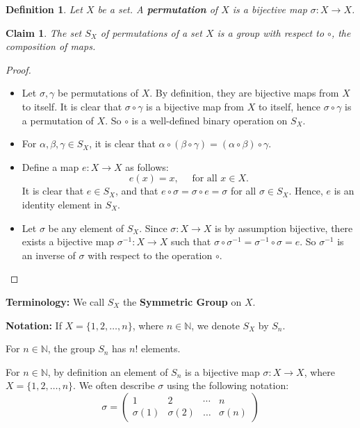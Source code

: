 \documentclass[a4paper,12pt]{report}
\newcommand{\ra}{\longrightarrow}
\newcounter{statement}
\numberwithin{statement}{chapter}
\newtheorem{defn}[statement]{Definition}
\newtheorem{claim}[statement]{Claim}
\numberwithin{equation}{chapter}
\numberwithin{section}{chapter}
\numberwithin{subsection}{section}
\begin{document}
\begin{defn}
Let $X$ be a set.  A  {\bf permutation}  of $X$ is a bijective map $\sigma : X \ra X$.
\end{defn}
\begin{claim}

The set $S_X$ of permutations of a set $X$
is a group with respect to $\circ$, the composition of maps.

\end{claim}
\begin{proof}

\begin{itemize}
\item 
Let $\sigma, \gamma$ be permutations of $X$.
By definition, they are bijective maps from $X$ to itself.
It is clear that $\sigma\circ\gamma$ is a bijective map from $X$ to itself,
hence $\sigma\circ\gamma$ is a permutation of $X$.  So $\circ$ is a well-defined
binary operation on $S_X$.

\item 
For $\alpha, \beta, \gamma \in S_X$, it is clear that
$\alpha\circ(\beta\circ \gamma) = (\alpha\circ\beta)\circ\gamma$.

\item 
Define a map $e : X \ra X$ as follows:
\[
e(x) = x,\quad \text{ for all } x \in X.
\]
It is clear that $e \in S_X$, and that $e \circ \sigma = \sigma\circ e = \sigma$
for all $\sigma \in S_X$.  Hence, $e$ is an identity element in $S_X$.

\item 
Let $\sigma$ be any element of $S_X$.  Since $\sigma : X \ra X$ is by assumption bijective,
there exists a bijective map $\sigma^{-1} : X \ra X$
such that $\sigma\circ\sigma^{-1} = \sigma^{-1}\circ \sigma = e$.
So $\sigma^{-1}$
is an inverse of $\sigma$ with respect to the operation $\circ$.
\end{itemize}


\end{proof}




 {\bf Terminology:} 
We call $S_X$ the  {\bf Symmetric Group}  on $X$.



 {\bf Notation:} 
If $X = \{1, 2, \ldots, n\}$, where $n \in \mathbb{N}$,
we denote $S_X$ by $S_n$.



For $n \in \mathbb{N}$, the group $S_n$ has $n!$ elements.



For $n \in \mathbb{N}$,
by definition an element of $S_n$ is a bijective map $\sigma : X \ra X$,
where $X = \{1, 2, \ldots, n\}$.
We often describe $\sigma$ using the following notation:
\[
\sigma = \left(\begin{matrix}
1 & 2 & \cdots & n\\
\sigma(1) & \sigma(2) & \ldots & \sigma(n)
\end{matrix}
\right)
\]
\end{document}
